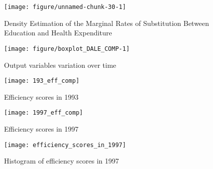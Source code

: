 \documentclass[12pt,a4paper]{article}\usepackage[]{graphicx}\usepackage[]{color}
\newenvironment{knitrout}{}{} %
\begin{document}
\begin{knitrout}
\color{fgcolor}\begin{figure}[htbp]

{\centering \texttt{[image: figure/unnamed-chunk-30-1]} 

}

\caption[Density Estimation of the Marginal Rates of Substitution Between Education and Health Expenditure]{Density Estimation of the Marginal Rates of Substitution Between Education and Health Expenditure}\label{fig:unnamed-chunk-30}
\end{figure}


\end{knitrout}

\begin{knitrout}
\color{fgcolor}\begin{figure}[htbp]

{\centering \texttt{[image: figure/boxplot\_DALE\_COMP-1]} 

}

\caption[Output variables variation over time]{Output variables variation over time}\label{fig:boxplot_DALE_COMP}
\end{figure}


\end{knitrout}


\begin{figure}
\center
    \texttt{[image: 193\_eff\_comp]}
    \caption{Efficiency scores in 1993}
    \label{fig:sfa93}
\end{figure}

\begin{figure}
\center
    \texttt{[image: 1997\_eff\_comp]}
    \caption{Efficiency scores in 1997}
    \label{fig:sfa97}
\end{figure}

\begin{figure}
\center
    \texttt{[image: efficiency\_scores\_in\_1997]}
    \caption{Histogram of efficiency scores in 1997}
    \label{fig:hist.sfa}
\end{figure}


\end{document}
